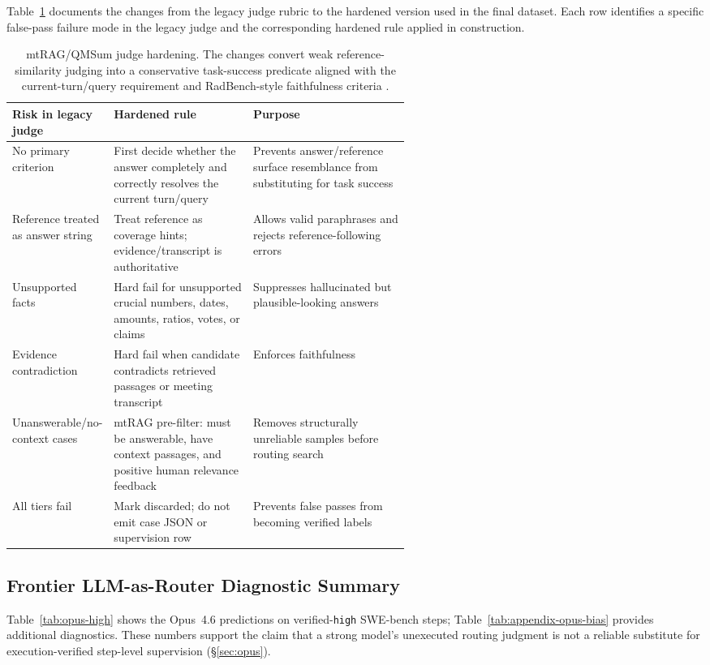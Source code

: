 Table~\ref{tab:appendix-judge} documents the changes from the legacy judge rubric to the hardened version
used in the final dataset. Each row identifies a specific false-pass failure mode in the legacy judge
and the corresponding hardened rule applied in construction.

\begin{table}[ht]
\centering
\small
\caption{mtRAG/QMSum judge hardening. The changes convert weak reference-similarity judging
into a conservative task-success predicate aligned with the current-turn/query requirement
and RadBench-style faithfulness criteria \citep{kuo2025radbench}.}
\label{tab:appendix-judge}
\begin{tabularx}{\linewidth}{p{0.22\linewidth}p{0.35\linewidth}X}
\toprule
Risk in legacy judge & Hardened rule & Purpose \\
\midrule
No primary criterion &
  First decide whether the answer completely and correctly resolves the current turn/query &
  Prevents answer/reference surface resemblance from substituting for task success \\
Reference treated as answer string &
  Treat reference as coverage hints; evidence/transcript is authoritative &
  Allows valid paraphrases and rejects reference-following errors \\
Unsupported facts &
  Hard fail for unsupported crucial numbers, dates, amounts, ratios, votes, or claims &
  Suppresses hallucinated but plausible-looking answers \\
Evidence contradiction &
  Hard fail when candidate contradicts retrieved passages or meeting transcript &
  Enforces faithfulness \\
Unanswerable/no-context cases &
  mtRAG pre-filter: must be answerable, have context passages, and positive human relevance feedback &
  Removes structurally unreliable samples before routing search \\
All tiers fail &
  Mark discarded; do not emit case JSON or supervision row &
  Prevents false passes from becoming verified labels \\
\bottomrule
\end{tabularx}
\end{table}

\subsection{Frontier LLM-as-Router Diagnostic Summary}
\label{app:opus}

Table~\ref{tab:opus-high} shows the Opus~4.6 predictions on verified-\texttt{high} SWE-bench steps;
Table~\ref{tab:appendix-opus-bias} provides additional diagnostics.
These numbers support the claim that a strong model's unexecuted routing judgment is not a reliable
substitute for execution-verified step-level supervision (\S\ref{sec:opus}).

